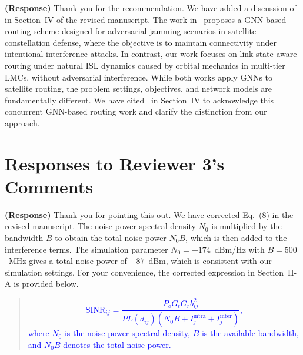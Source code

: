 \documentclass[letter]{article}
\begin{document}
\vspace{10mm}
\noindent {}

\vspace{5mm}
{\bf (Response)}
Thank you for the recommendation. We have added a discussion of~\cite{zhang2026anti} in Section~IV of the revised manuscript. The work in~\cite{zhang2026anti} proposes a GNN-based routing scheme designed for adversarial jamming scenarios in satellite constellation defense, where the objective is to maintain connectivity under intentional interference attacks. In contrast, our work focuses on link-state-aware routing under natural ISL dynamics caused by orbital mechanics in multi-tier LMCs, without adversarial interference. While both works apply GNNs to satellite routing, the problem settings, objectives, and network models are fundamentally different. We have cited~\cite{zhang2026anti} in Section~IV to acknowledge this concurrent GNN-based routing work and clarify the distinction from our approach.

\newpage
\vspace{0.1cm} \noindent
\section*{\large Responses to Reviewer 3's Comments}

\noindent {}

\vspace{5mm}
{\bf (Response)}
Thank you for pointing this out. We have corrected Eq.~(8) in the revised manuscript. The noise power spectral density $N_0$ is multiplied by the bandwidth $B$ to obtain the total noise power $N_0 B$, which is then added to the interference terms. The simulation parameter $N_0 = -174$~dBm/Hz with $B = 500$~MHz gives a total noise power of $-87$~dBm, which is consistent with our simulation settings. For your convenience, the corrected expression in Section~II-A is provided below.

\begin{quote}
\textcolor{blue}{
\begin{equation}
\mathrm{SINR}_{ij} = \frac{P_o G_t G_r b_{ij}^2}{PL(d_{ij})\left(N_0 B + I_{j}^{\mathrm{intra}} + I_{j}^{\mathrm{inter}}\right)}, \tag{8}
\end{equation}
where $N_0$ is the noise power spectral density, $B$ is the available bandwidth, and $N_0 B$ denotes the total noise power.}
\end{quote}
\end{document}
